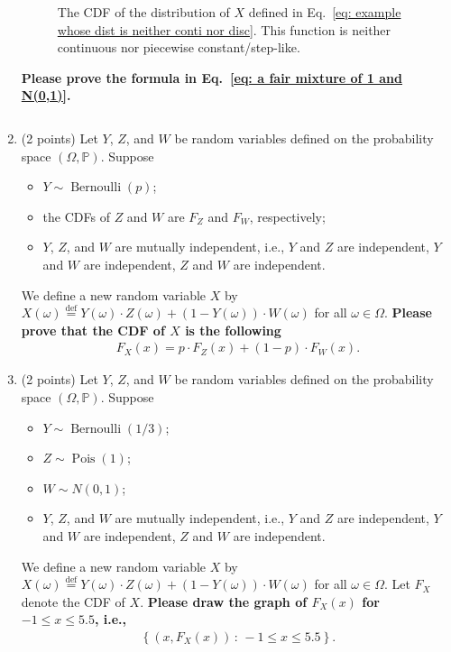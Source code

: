 \documentclass[11pt]{article}
\newcommand{\1}{\mathbb{1}}
\begin{document}
\begin{enumerate}
\begin{figure}
    \caption{The CDF of the distribution of $X$ defined in Eq.~\eqref{eq: example whose dist is neither conti nor disc}. This function is neither continuous nor piecewise constant/step-like.}
    \label{fig: example whose dist is neither conti nor disc}
\end{figure}

\textbf{Please prove the formula in Eq.~\eqref{eq: a fair mixture of 1 and N(0,1)}.}

\[\]


\item (2 points) Let $Y$, $Z$, and $W$ be random variables defined on the probability space $(\Omega,\mathbb{P})$. Suppose
    \begin{itemize}
        \item $Y\sim\operatorname{Bernoulli}(p)$;
        \item the CDFs of $Z$ and $W$ are $F_Z$ and $F_W$, respectively;
        \item $Y$, $Z$, and $W$ are mutually independent, i.e., $Y$ and $Z$ are independent, $Y$ and $W$ are independent, $Z$ and $W$ are independent.
    \end{itemize} 
    We define a new random variable $X$ by $X(\omega)\overset{\operatorname{def}}{=} Y(\omega)\cdot Z(\omega) + (1-Y(\omega))\cdot W(\omega)$ for all $\omega\in\Omega$. \textbf{Please prove that the CDF of $X$ is the following}
    \begin{align*}
        F_X(x) = p\cdot F_Z(x)+(1-p)\cdot F_W(x).
    \end{align*}


\item (2 points) Let $Y$, $Z$, and $W$ be random variables defined on the probability space $(\Omega,\mathbb{P})$. Suppose
    \begin{itemize}
        \item $Y\sim\operatorname{Bernoulli}(1/3)$;
        \item $Z\sim \operatorname{Pois}(1)$;
        \item $W\sim N(0,1)$;
        \item $Y$, $Z$, and $W$ are mutually independent, i.e., $Y$ and $Z$ are independent, $Y$ and $W$ are independent, $Z$ and $W$ are independent.
    \end{itemize} 
    We define a new random variable $X$ by $X(\omega)\overset{\operatorname{def}}{=} Y(\omega)\cdot Z(\omega) + (1-Y(\omega))\cdot W(\omega)$ for all $\omega\in\Omega$. Let $F_X$ denote the CDF of $X$. \textbf{Please draw the graph of $F_X(x)$ for $-1\le x\le 5.5$, i.e., }
    \begin{align*}
        \left\{\left(x, F_X(x)\right) \,:\, -1\le x\le 5.5\right\}.
    \end{align*}



\end{enumerate}
\end{document}

